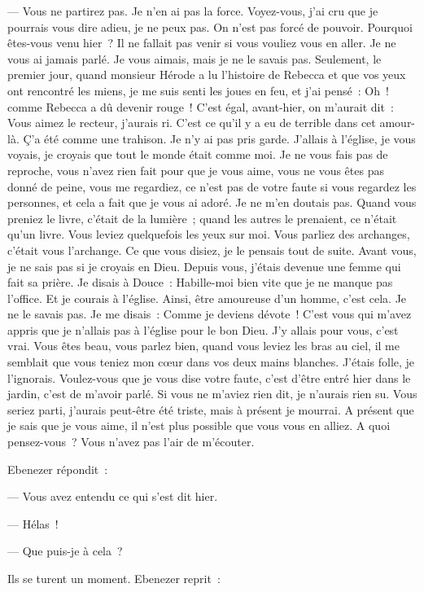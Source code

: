 \documentclass[french,twoside]{book} %
\begin{document}
— Vous ne partirez pas. Je n’en ai pas la force. Voyez-vous, j’ai cru que je pourrais vous dire adieu, je ne peux pas. On n’est pas forcé de pouvoir. Pourquoi êtes-vous venu hier ? Il ne fallait pas venir si vous vouliez vous en aller. Je ne vous ai jamais parlé. Je vous aimais, mais je ne le savais pas. Seulement, le premier jour, quand monsieur Hérode a lu l’histoire de Rebecca et que vos yeux ont rencontré les miens, je me suis senti les joues en feu, et j’ai pensé : Oh ! comme Rebecca a dû devenir rouge ! C’est égal, avant-hier, on  m’aurait dit : Vous aimez le recteur, j’aurais ri. C’est ce qu’il y a eu de terrible dans cet amour-là. Ç’a été comme une trahison. Je n’y ai pas pris garde. J’allais à l’église, je vous voyais, je croyais que tout le monde était comme moi. Je ne vous fais pas de reproche, vous n’avez rien fait pour que je vous aime, vous ne vous êtes pas donné de peine, vous me regardiez, ce n’est pas de votre faute si vous regardez les personnes, et cela a fait que je vous ai adoré. Je ne m’en doutais pas. Quand vous preniez le livre, c’était de la lumière ; quand les autres le prenaient, ce n’était qu’un livre. Vous leviez quelquefois les yeux sur moi. Vous parliez des archanges, c’était vous l’archange. Ce que vous disiez, je le pensais tout de suite. Avant vous, je ne sais pas si je croyais en Dieu. Depuis vous, j’étais devenue une femme qui fait sa prière. Je disais à Douce : Habille-moi bien vite que je ne manque pas l’office. Et je courais à l’église. Ainsi, être amoureuse d’un homme, c’est cela. Je ne le savais pas. Je me disais : Comme je deviens dévote ! C’est vous qui m’avez appris que je n’allais pas à l’église pour le bon Dieu. J’y allais pour vous, c’est vrai. Vous êtes beau, vous parlez bien, quand vous leviez les bras au ciel, il me semblait que vous teniez mon cœur dans vos deux mains blanches. J’étais folle, je l’ignorais. Voulez-vous que je vous dise votre faute, c’est d’être entré hier dans le jardin, c’est de m’avoir parlé. Si vous ne m’aviez rien dit, je n’aurais rien su. Vous seriez parti, j’aurais peut-être été triste, mais à présent je mourrai. A présent que je sais que je vous aime, il n’est plus possible que vous vous  en alliez. A quoi pensez-vous ? Vous n’avez pas l’air de m’écouter.\par
Ebenezer répondit :\par
— Vous avez entendu ce qui s’est dit hier.\par
— Hélas !\par
— Que puis-je à cela ?\par
Ils se turent un moment. Ebenezer reprit :\par
\end{document}
